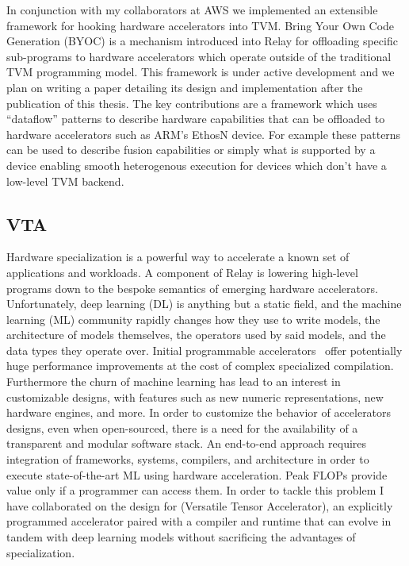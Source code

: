In conjunction with my collaborators at AWS we implemented an
  extensible framework for hooking hardware accelerators into
  TVM.
Bring Your Own Code Generation (BYOC) is a mechanism introduced
  into Relay for offloading specific sub-programs to hardware
  accelerators which operate outside of the traditional TVM
  programming model.
This framework is under active development and we plan
  on writing a paper detailing its design and implementation
  after the publication of this thesis.
The key contributions are a framework which uses ``dataflow''
  patterns to describe hardware capabilities that can be
  offloaded to hardware accelerators such as ARM's EthosN
  device.
For example these patterns can be used to describe fusion
  capabilities or simply what is supported by a device
  enabling smooth heterogenous execution for devices
  which don't have a low-level TVM backend.

\subsection{VTA}
\label{sec:vta}

Hardware specialization is a powerful way to accelerate
  a known set of applications and workloads.
A component of Relay is lowering high-level programs down
  to the bespoke semantics of emerging hardware accelerators.
Unfortunately, deep learning (DL) is anything but a static field, and the machine learning (ML) community
  rapidly changes how they use to write models, the architecture of models themselves, the operators
  used by said models, and the data types they operate over.
Initial programmable accelerators~\citep{tpuv1} offer potentially huge performance
  improvements at the cost of complex specialized compilation.
Furthermore the churn of machine learning has lead to an interest
  in customizable designs, with features such as new numeric representations,
  new hardware engines, and more.
In order to customize the behavior of accelerators designs, even when open-sourced,
  there is a need for the availability of a transparent and modular software stack.
An end-to-end approach requires integration of frameworks, systems, compilers,
  and architecture in order to execute state-of-the-art ML using hardware acceleration.
Peak FLOPs provide value only if a programmer can access them.
In order to tackle this problem I have collaborated on the design for \vta (Versatile Tensor Accelerator),
  an explicitly programmed accelerator paired with a compiler and runtime that can evolve
  in tandem with deep learning models without sacrificing the advantages of specialization.

